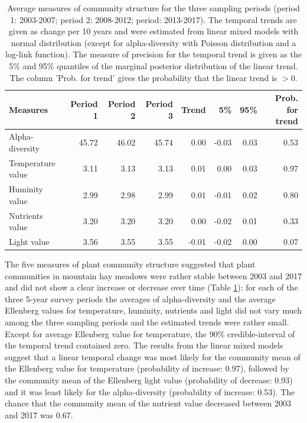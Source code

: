 \documentclass[fleqn,10pt,lineno]{wlpeerj} %
\theoremstyle{definition}
\theoremstyle{definition}
\theoremstyle{definition}
\theoremstyle{remark}
\begin{document}
\begin{table}

\caption{\label{tab:communitytrendstab}Average measures of community structure for the three sampling periods (period 1: 2003-2007; period 2: 2008-2012; period: 2013-2017). The temporal trends are given as change per 10 years and were estimated from linear mixed models with normal distribution (except for alpha-diversity with Poisson distribution and a log-link function). The measure of precision for the temporal trend is given as the 5\% and 95\% quantiles of the marginal posterior distribution of the linear trend. The column 'Prob. for trend' gives the probability that the linear trend is $> 0$.}
\centering
\begin{tabular}[t]{lrrrrrrr}
\toprule
Measures & Period 1 & Period 2 & Period 3 & Trend & 5\% & 95\% & Prob. for trend\\
\midrule
Alpha-diversity & 45.72 & 46.02 & 45.74 & 0.00 & -0.03 & 0.03 & 0.53\\
Temperature value & 3.11 & 3.13 & 3.13 & 0.01 & 0.00 & 0.03 & 0.97\\
Huminity value & 2.99 & 2.98 & 2.99 & 0.01 & -0.01 & 0.02 & 0.80\\
Nutrients value & 3.20 & 3.20 & 3.20 & 0.00 & -0.02 & 0.01 & 0.33\\
Light value & 3.56 & 3.55 & 3.55 & -0.01 & -0.02 & 0.00 & 0.07\\
\bottomrule
\end{tabular}
\end{table}

The five measures of plant community structure suggested that plant
communities in mountain hay meadows were rather stable between 2003 and
2017 and did not show a clear increase or decrease over time (Table
\ref{tab:communitytrendstab}): for each of the three 5-year survey
periods the averages of alpha-diversity and the average Ellenberg values
for temperature, huminity, nutrients and light did not vary much among
the three sampling periods and the estimated trends were rather small.
Except for average Ellenberg value for temperature, the 90\%
credible-interval of the temporal trend contained zero. The results from
the linear mixed models suggest that a linear temporal change was most
likely for the community mean of the Ellenberg value for temperature
(probability of increase: 0.97), followed by the community mean of the
Ellenberg light value (probability of decrease: 0.93) and it was least
likely for the alpha-diversity (probability of increase: 0.53). The
chance that the community mean of the nutrient value decreased between
2003 and 2017 was 0.67.
\end{document}
